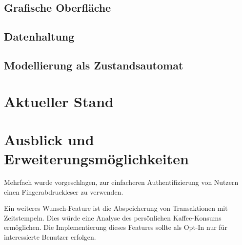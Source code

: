 \documentclass[11pt,a4paper]{IEEEtran}
\begin{document}
\subsection{Grafische Oberfläche}
\label{sec:gui}

\subsection{Datenhaltung}

\subsection{Modellierung als Zustandsautomat}

\section{Aktueller Stand}

\section{Ausblick und Erweiterungsmöglichkeiten}

Mehrfach wurde vorgeschlagen, zur einfacheren Authentifizierung von Nutzern 
einen Fingerabdruckleser zu verwenden. 

Ein weiteres Wunsch-Feature ist die Abspeicherung von Transaktionen mit
Zeitstempeln. Dies würde eine Analyse des persönlichen Kaffee-Konsums
ermöglichen. Die Implementierung dieses Features sollte als Opt-In nur für
interessierte Benutzer erfolgen. 

\printbibliography
\end{document}
